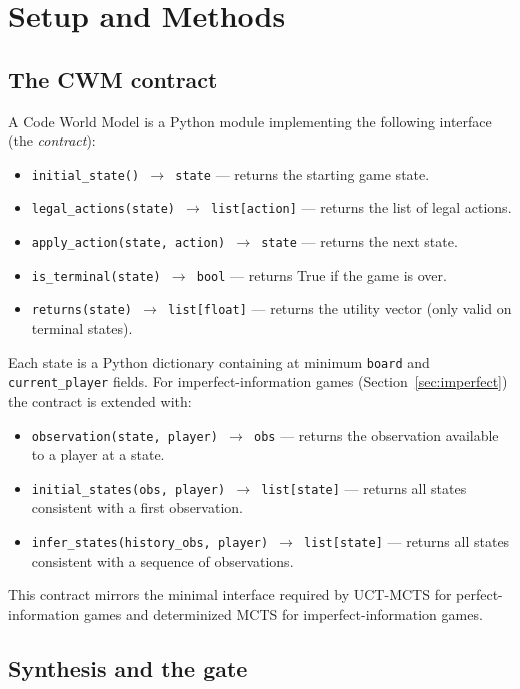 \documentclass[11pt]{article}
\theoremstyle{remark}
\begin{document}
\section{Setup and Methods}

\subsection{The CWM contract}

A Code World Model is a Python module implementing the following interface (the \emph{contract}):

\begin{itemize}
\item \texttt{initial\_state() $\to$ state} --- returns the starting game state.
\item \texttt{legal\_actions(state) $\to$ list[action]} --- returns the list of legal actions.
\item \texttt{apply\_action(state, action) $\to$ state} --- returns the next state.
\item \texttt{is\_terminal(state) $\to$ bool} --- returns True if the game is over.
\item \texttt{returns(state) $\to$ list[float]} --- returns the utility vector (only valid on terminal states).
\end{itemize}

Each state is a Python dictionary containing at minimum \texttt{board} and \texttt{current\_player} fields. For imperfect-information games (Section~\ref{sec:imperfect}) the contract is extended with:

\begin{itemize}
\item \texttt{observation(state, player) $\to$ obs} --- returns the observation available to a player at a state.
\item \texttt{initial\_states(obs, player) $\to$ list[state]} --- returns all states consistent with a first observation.
\item \texttt{infer\_states(history\_obs, player) $\to$ list[state]} --- returns all states consistent with a sequence of observations.
\end{itemize}

This contract mirrors the minimal interface required by UCT-MCTS for perfect-information games and determinized MCTS for imperfect-information games.

\subsection{Synthesis and the gate}
\label{sec:gate}
\end{document}
